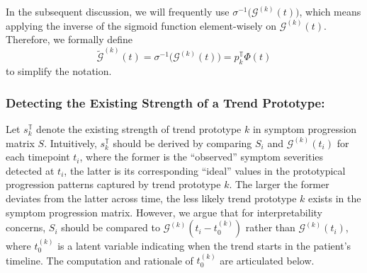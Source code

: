 \documentclass[mnsc]{informs3b} %
\begin{document}
In the subsequent discussion, we will frequently use $\sigma^{-1}\big(\mathcal{G}^{(k)}(t)\big)$, which means applying the inverse of the sigmoid function element-wisely on $\mathcal{G}^{(k)}(t)$. Therefore, we formally define 
\begin{equation}
\label{eq:g_k_t_tilde}
{\tilde{\mathcal{G}}}^{(k)}(t) = \sigma^{-1}\big(\mathcal{G}^{(k)}(t)\big) = p_k^{\mathbb{T}} \Phi(t)
\end{equation}
to simplify the notation.
 

\subsubsection{Detecting the Existing Strength of a Trend Prototype: }\label{sec:method:proto_layer:s_k_trend} 

Let $s_k^{\mathbb{T}}$ denote the existing strength of trend prototype $k$ in symptom progression matrix $S$.
Intuitively, $s_k^{\mathbb{T}}$ should be derived by comparing $S_i$ and $\mathcal{G}^{(k)}(t_i)$ for each timepoint $t_i$, where the former is the ``observed'' symptom severities detected at $t_i$, the latter is its corresponding ``ideal'' values in the prototypical progression patterns captured by trend prototype $k$. The larger the former deviates from the latter across time, the less likely trend prototype $k$ exists in the symptom progression matrix.
However, we argue that for interpretability concerns, $S_i$ should be compared to $\mathcal{G}^{(k)}(t_i-t_0^{(k)})$ rather than $\mathcal{G}^{(k)}(t_i)$, where $t_0^{(k)}$ is a latent variable indicating when the trend starts in the patient's timeline. The computation and rationale of $t_0^{(k)}$ are articulated below.
\end{document}
